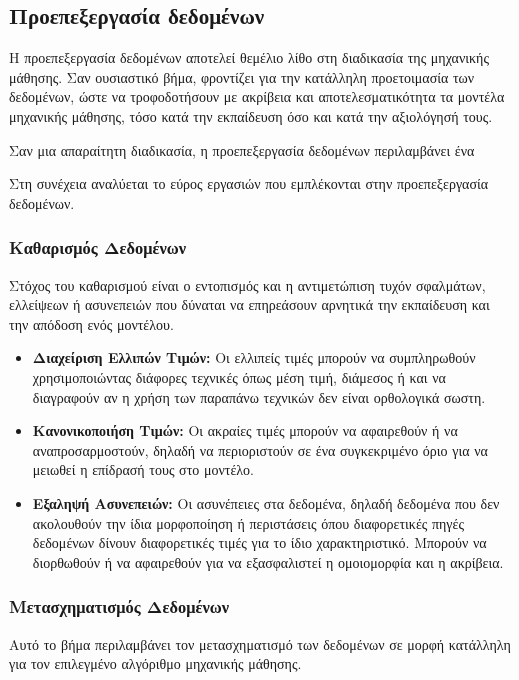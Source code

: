 \documentclass[12pt,twoside]{article}
\newcommand{\gr}{\selectlanguage{greek}}
\begin{document}
\subsection{\gr Προεπεξεργασία δεδομένων}

Η προεπεξεργασία δεδομένων αποτελεί θεμέλιο λίθο στη διαδικασία της μηχανικής μάθησης. Σαν ουσιαστικό βήμα, φροντίζει για την κατάλληλη προετοιμασία των δεδομένων, ώστε να τροφοδοτήσουν με ακρίβεια και αποτελεσματικότητα τα μοντέλα μηχανικής μάθησης, τόσο κατά την εκπαίδευση όσο και κατά την αξιολόγησή τους.

Σαν μια απαραίτητη διαδικασία, η προεπεξεργασία δεδομένων περιλαμβάνει ένα

Στη συνέχεια αναλύεται το εύρος εργασιών που εμπλέκονται στην προεπεξεργασία δεδομένων.

\subsubsection{\gr Καθαρισμός Δεδομένων}

Στόχος του καθαρισμού είναι ο εντοπισμός και η αντιμετώπιση τυχόν σφαλμάτων, ελλείψεων ή ασυνεπειών που δύναται να επηρεάσουν αρνητικά την εκπαίδευση και την απόδοση ενός μοντέλου.

\begin{itemize}
    \item \textbf{\gr Διαχείριση Ελλιπών Τιμών:} Οι ελλιπείς τιμές μπορούν να συμπληρωθούν χρησιμοποιώντας διάφορες τεχνικές όπως μέση τιμή, διάμεσος ή και να διαγραφούν αν η χρήση των παραπάνω τεχνικών δεν είναι ορθολογικά σωστη.
    \item \textbf{\gr Κανονικοποιήση Τιμών:} Οι ακραίες τιμές μπορούν να αφαιρεθούν ή να αναπροσαρμοστούν, δηλαδή να περιοριστούν σε ένα συγκεκριμένο όριο για να μειωθεί η επίδρασή τους στο μοντέλο.
    \item \textbf{\gr Εξαληψή Ασυνεπειών:} Οι ασυνέπειες στα δεδομένα, δηλαδή δεδομένα που δεν ακολουθούν την ίδια μορφοποίηση ή περιστάσεις όπου διαφορετικές πηγές δεδομένων δίνουν διαφορετικές τιμές για το ίδιο χαρακτηριστικό. Μπορούν να διορθωθούν ή να αφαιρεθούν για να εξασφαλιστεί η ομοιομορφία και η ακρίβεια.
\end{itemize}

\subsubsection{\gr Μετασχηματισμός Δεδομένων}

Αυτό το βήμα περιλαμβάνει τον μετασχηματισμό των δεδομένων σε μορφή κατάλληλη για τον επιλεγμένο αλγόριθμο μηχανικής μάθησης.
\end{document}

